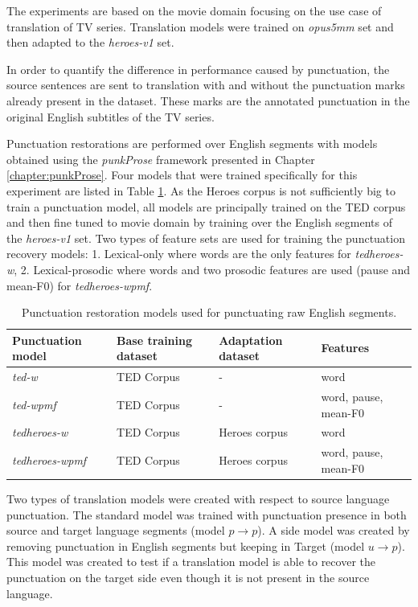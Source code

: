 The experiments are based on the movie domain focusing on the use case of translation of TV series. Translation models were trained on \textit{opus5mm} set and then adapted to the \textit{heroes-v1} set. 

In order to quantify the difference in performance caused by punctuation, the source sentences are sent to translation with and without the punctuation marks already present in the dataset. These marks are the annotated punctuation in the original English subtitles of the TV series. %

Punctuation restorations are performed over English segments with models obtained using the \textit{punkProse} framework presented in Chapter \ref{chapter:punkProse}. Four models that were trained specifically for this experiment are listed in Table \ref{table:punkModels}. As the Heroes corpus is not sufficiently big to train a punctuation model, all models are principally trained on the TED corpus and then fine tuned to movie domain by training over the English segments of the \textit{heroes-v1} set. Two types of feature sets are used for training the punctuation recovery models: 1. Lexical-only where words are the only features for \textit{tedheroes-w}, 2. Lexical-prosodic where words and two prosodic features are used (pause and mean-F0) for \textit{tedheroes-wpmf}.

\begin{table}[!tbp]
\begin{tabular}{p{2.8cm}|p{2.7cm}|p{2.5cm}|p{3.75cm}}
\toprule
\textbf{Punctuation model} & \textbf{Base training dataset} & \textbf{Adaptation dataset} & \textbf{Features}\\
\midrule
\textit{ted-w}          & TED Corpus   & -               & word \\
\textit{ted-wpmf }      & TED Corpus   & -               & word, pause, mean-F0 \\
\textit{tedheroes-w}    & TED Corpus   & Heroes corpus   & word \\
\textit{tedheroes-wpmf} & TED Corpus   & Heroes corpus   & word, pause, mean-F0 \\
\bottomrule
\end{tabular}
\caption{Punctuation restoration models used for punctuating raw English segments.}
\label{table:punkModels}
\end{table}

Two types of translation models were created with respect to source language punctuation. The standard model was trained with punctuation presence in both source and target language segments (model $ p \rightarrow p $). A side model was created by removing punctuation in English segments but keeping in Target (model $ u \rightarrow p $). This model was created to test if a translation model is able to recover the punctuation on the target side even though it is not present in the source language.

